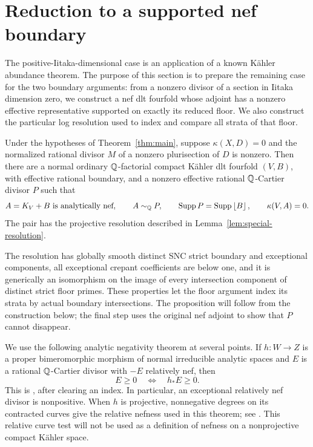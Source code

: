 \section{Reduction to a supported nef boundary}\label{sec:reduction}

The positive-Iitaka-dimensional case is an application of a known
K\"ahler abundance theorem.  The purpose of this section is to prepare
the remaining case for the two boundary arguments: from a nonzero divisor
of a section in Iitaka dimension zero, we construct a nef dlt fourfold
whose adjoint has a nonzero effective representative supported on exactly
its reduced floor.  We also construct the particular log resolution used
to index and compare all strata of that floor.

\begin{proposition}\label{prop:supported-model}
Under the hypotheses of Theorem~\ref{thm:main}, suppose
\(\kappa(X,D)=0\) and the normalized rational divisor \(M\) of a nonzero plurisection of
\(D\) is nonzero.  Then there are a normal ordinary \(\mathbb Q\)-factorial
compact K\"ahler dlt fourfold \((V,B)\), with effective rational boundary,
and a nonzero effective rational \(\mathbb Q\)-Cartier divisor \(P\) such that
\[
 A=K_V+B\text{ is analytically nef},\qquad
 A\sim_\mathbb Q P,\qquad \operatorname{Supp} P=\operatorname{Supp}\left\lfloor B\right\rfloor,\qquad \kappa(V,A)=0.
\]
The pair has the projective resolution described in
Lemma~\ref{lem:special-resolution}.
\end{proposition}

The resolution has globally smooth distinct SNC strict boundary and
exceptional components, all exceptional crepant coefficients are below
one, and it is generically an isomorphism on the image of every
intersection component of distinct strict floor primes.  These properties
let the floor argument index its strata by actual boundary intersections.
The proposition will follow from the construction below; the final step
uses the original nef adjoint to show that \(P\) cannot disappear.

We use the following analytic negativity theorem at several points.
If \(h:W\to Z\) is a proper bimeromorphic morphism of normal irreducible
analytic spaces and \(E\) is a rational \(\mathbb Q\)-Cartier divisor with \(-E\)
relatively nef, then
\[
 E\geq0\quad\Longleftrightarrow\quad h_*E\geq0.
\]
This is \cite[Lemma~1.3]{Wang2021}, after clearing an index.  In particular,
an exceptional relatively nef divisor is nonpositive.  When \(h\) is
projective, nonnegative degrees on its contracted curves give the relative
nefness used in this theorem; see \cite[Appendix~B]{Wang2021}.  This relative
curve test will not be used as a definition of nefness on a nonprojective
compact K\"ahler space.

